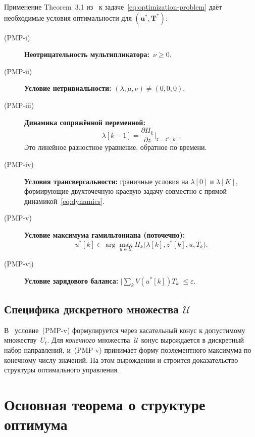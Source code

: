 Применение Theorem~3.1 из~\cite{paruchuri2019_discrete_pmp} к
задаче~\eqref{eq:optimization-problem} даёт необходимые условия оптимальности
для $(\mathbf{u}^*, \mathbf{T}^*)$:

\begin{description}
    \item[(PMP-i)] \textbf{Неотрицательность мультипликатора:}~$\nu \ge 0$.
    \item[(PMP-ii)] \textbf{Условие нетривиальности:}
        $(\lambda, \mu, \nu) \ne (0, 0, 0)$.
    \item[(PMP-iii)] \textbf{Динамика сопряжённой переменной:}
        \begin{equation}\label{eq:adjoint}
            \lambda[k-1] = \frac{\partial H_k}{\partial z}\Big|_{z = z^*[k]}.
        \end{equation}
        Это линейное разностное уравнение, обратное по времени.
    \item[(PMP-iv)] \textbf{Условия трансверсальности:} граничные условия
        на $\lambda[0]$ и $\lambda[K]$, формирующие двухточечную краевую
        задачу совместно с прямой динамикой~\eqref{eq:dynamics}.
    \item[(PMP-v)] \textbf{Условие максимума гамильтониана (поточечно):}
        \begin{equation}\label{eq:pmp-max}
            u^*[k] \in \arg\!\max_{u \in \mathcal{U}}
                H_k\bigl(\lambda[k], z^*[k], u, T_k\bigr).
        \end{equation}
    \item[(PMP-vi)] \textbf{Условие зарядового баланса:}
        $\bigl|\sum_k V(u^*[k]) T_k\bigr| \le \varepsilon$.
\end{description}

\subsection*{Специфика дискретного множества $\mathcal{U}$}

В~\cite{paruchuri2019_discrete_pmp} условие~(PMP-v) формулируется через
касательный конус к допустимому множеству~$U_t$. Для \emph{конечного}
множества~$\mathcal{U}$ конус вырождается в дискретный набор
направлений, и~(PMP-v) принимает форму поэлементного максимума по конечному
числу значений. На этом вырождении и строится доказательство
структуры оптимального управления.


\section{Основная теорема о структуре оптимума}\label{sec:main-theorem}

